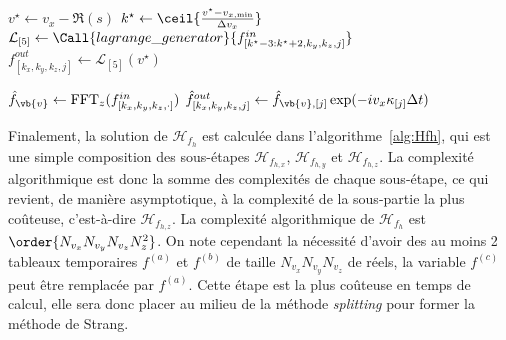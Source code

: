 \begin{itemize}
\begin{algorithm}
\begin{algorithmic}[1]
              \State $v^{\star} \gets v_x - \Re(s)$
              \State $k^{\star} \gets \ceil{\frac{ v^{\star}-v_{x,\text{min}} }{ \Delta v_x }}$
              \State $\mathcal{L}_{[5]} \gets \Call{lagrange\_generator}{f^{in}_{[k^\star-3:k^\star+2,k_y,k_z,j]}}$
              \State $f^{out}_{[k_x,k_y,k_z,j]} \gets \mathcal{L}_{[5]}( v^{\star} )$
            \EndFor
          \EndFor
        \EndFunction

          \vspace{0.25cm}

          \ForAll{$(k_x,k_y,k_z)\in[\![0,N_{v_x}[\![\times[\![0,N_{v_y}[\![\times[\![0,N_{v_z}[\![$}
            \State $\hat{f}_{\vb{v}} \gets \text{FFT}_z(f^{in}_{[k_x,k_y,k_z,\cdot]})$
              \State $\hat{f}^{out}_{[k_x,k_y,k_z,j]} \gets \hat{f}_{\vb{v},[j]}\exp(-iv_x\kappa_{[j]}\Delta t)$
            \EndFor
          \EndFor
        \EndFunction

          \vspace{0.25cm}

          \State {}
          \State {}
          \State {}
        \EndFunction
      \end{algorithmic}
    \end{algorithm}
\end{itemize}

Finalement, la solution de $\mathcal{H}_{f_h}$ est calculée dans l'algorithme~\ref{alg:Hfh}, qui est une simple composition des sous-étapes $\mathcal{H}_{f_{h,x}}$, $\mathcal{H}_{f_{h,y}}$ et $\mathcal{H}_{f_{h,z}}$. La complexité algorithmique est donc la somme des complexités de chaque sous-étape, ce qui revient, de manière asymptotique, à la complexité de la sous-partie la plus coûteuse, c'est-à-dire $\mathcal{H}_{f_{h,z}}$. La complexité algorithmique de $\mathcal{H}_{f_h}$ est $\order{N_{v_x}N_{v_y}N_{v_z}N_z^2}$. On note cependant la nécessité d'avoir des au moins 2 tableaux temporaires $f^{(a)}$ et $f^{(b)}$ de taille $N_{v_x}N_{v_y}N_{v_z}$ de réels, la variable $f^{(c)}$ peut être remplacée par $f^{(a)}$. Cette étape est la plus coûteuse en temps de calcul, elle sera donc placer au milieu de la méthode \emph{splitting} pour former la méthode de Strang.

